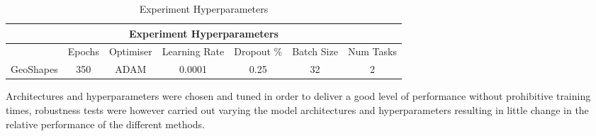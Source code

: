 \begin{table}[h]
\caption{Experiment Hyperparameters} \label{tab:HyperParams}
\begin{tabular}{|c||c|c|c|c|c|c|}
\hline
\multicolumn{7}{|c|}{Experiment Hyperparameters} \\
\hline
 &Epochs & Optimiser &Learning Rate & Dropout \% & Batch Size & Num Tasks \\
\hline
GeoShapes & 350 & ADAM & 0.0001 & 0.25 & 32 & 2  \\
\hline
\end{tabular}
\end{table}


Architectures and hyperparameters were chosen and tuned in order to deliver a good level of performance without prohibitive training times, robustness tests were however carried out varying the model architectures and hyperparameters resulting in little change in the relative performance of the different methods. 
